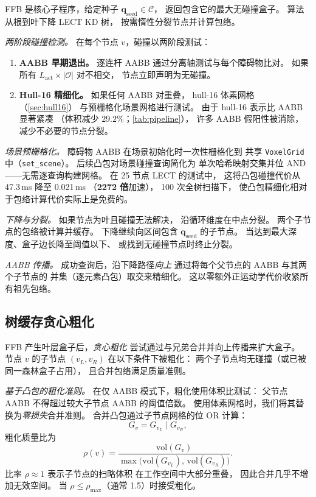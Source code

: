 \documentclass[journal]{IEEEtran}
\newcommand{\Cspace}{\mathcal{C}}
\newcommand{\calO}{\mathcal{O}}
\begin{document}
FFB 是核心子程序，给定种子
$\bm{q}_\text{seed} \in \Cspace$，
返回包含它的最大无碰撞盒子。
算法从根到叶下降 LECT KD 树，
按需惰性分裂节点并计算包络。

\emph{两阶段碰撞检测。}
在每个节点 $v$，碰撞以两阶段测试：
\begin{enumerate}
  \item \textbf{AABB 早期退出。}
    逐连杆 AABB 通过分离轴测试与每个障碍物比对。
    如果所有 $L_\text{act} \times |\calO|$ 对不相交，
    节点立即声明为无碰撞。
  \item \textbf{Hull-16 精细化。}
    如果任何 AABB 对重叠，
    hull-16 体素网格（\cref{sec:hull16}）
    与预栅格化场景网格进行测试。
    由于 hull-16 表示比 AABB 显著紧凑
    （体积减少 $29.2\%$；\cref{tab:pipeline}），
    许多 AABB 假阳性被消除，减少不必要的节点分裂。
\end{enumerate}

\emph{场景预栅格化。}
障碍物 AABB 在场景初始化时一次性栅格化到
共享 \texttt{VoxelGrid} 中（\texttt{set\_scene}）。
后续凸包对场景碰撞查询简化为
单次哈希映射交集并位 AND——无需逐查询构建网格。
在 25 节点 LECT 的测试中，
这将凸包碰撞代价从 47.3\,ms 降至 0.021\,ms
（\textbf{2272 倍}加速），
100 次全树扫描下，
使凸包精细化相对于包络计算代价实际上是免费的。

\emph{下降与分裂。}
如果节点为叶且碰撞无法解决，
沿循环维度在中点分裂。
两个子节点的包络被计算并缓存。
下降继续向区间包含 $\bm{q}_\text{seed}$ 的子节点。
当达到最大深度、盒子边长降至阈值以下、
或找到无碰撞节点时终止分裂。

\emph{AABB 传播。}
成功查询后，沿下降路径\emph{向上}
通过将每个父节点的 AABB 与其两个子节点的
并集（逐元素凸包）取交来精细化。
这以零额外正运动学代价收紧所有祖先包络。

\subsection{树缓存贪心粗化}\label{sec:coarsen}

FFB 产生叶层盒子后，\emph{贪心粗化}
尝试通过与兄弟合并并向上传播来扩大盒子。
节点 $v$ 的子节点 $(v_L, v_R)$ 在以下条件下被粗化：
两个子节点均无碰撞（或已被同一森林盒子占用），
且合并包络满足质量准则。

\emph{基于凸包的粗化准则。}
在仅 AABB 模式下，粗化使用体积比测试：
父节点 AABB 不得超过较大子节点 AABB 的阈值倍数。
使用体素网格时，我们将其替换为\emph{零损失}合并准则。
合并凸包通过子节点网格的位 OR 计算：
\begin{equation}\label{eq:coarsen_merge}
  G_{v} = G_{v_L} \mathbin{|} G_{v_R},
\end{equation}
粗化质量比为
\begin{equation}\label{eq:coarsen_ratio}
  \rho(v) = \frac{\mathrm{vol}(G_v)}{\max\bigl(\mathrm{vol}(G_{v_L}),\, \mathrm{vol}(G_{v_R})\bigr)}.
\end{equation}
比率 $\rho \approx 1$ 表示子节点的扫略体积
在工作空间中大部分重叠，
因此合并几乎不增加无效空间。
当 $\rho \leq \rho_\text{max}$（通常 1.5）时接受粗化。
\end{document}
